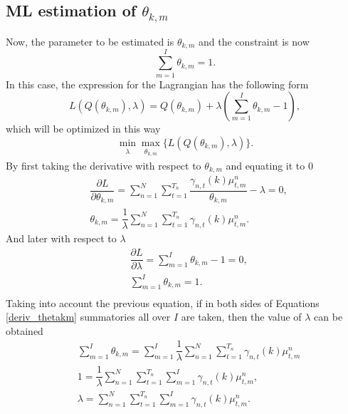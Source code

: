 \documentclass[12pt]{article}
\begin{document}
\subsection{ML estimation of $\theta_{k,m}$}
Now, the parameter to be estimated is $\theta_{k,m}$ and the constraint is now
\begin{equation}
\label{constraint_thetakm}
\sum \limits_{m=1}^{I} \theta_{k,m} = 1.
\end{equation}
In this case, the expression for the Lagrangian has the following form
\begin{equation}
\label{lagrange_thetakm}
L\left( Q(\theta_{k,m}),\lambda \right) = Q(\theta_{k,m}) + \lambda \left( \sum \limits_{m=1}^{I} \theta_{k,m} - 1 \right),
\end{equation}
which will be optimized in this way
\begin{equation}
\label{minmax_lagrange_thetakm}
\min_{\substack{\lambda}} \max_{\substack{\theta_{k,m}}} \lbrace L\left( Q(\theta_{k,m}),\lambda \right) \rbrace.
\end{equation}
By first taking the derivative with respect to $\theta_{k,m}$ and equating it to 0
\begin{equation}
\label{deriv_thetakm}
\begin{split}
& \dfrac{\partial L}{\partial \theta_{k,m}} = \sum \limits_{n=1}^{N}\sum _ { t = 1 } ^ { T _ { n } } \dfrac{\gamma_{n,t}(k)\mu_{t,m}^{n}}{\theta_{k,m}} - \lambda  = 0 , \\
& \theta_{k,m} = \dfrac{1}{\lambda} \sum \limits_{n=1}^{N} \sum _ { t = 1 } ^ { T _ { n } }\gamma_{n,t}(k)\mu_{t,m}^{n}.
\end{split}
\end{equation}
And later with respect to $\lambda$
\begin{equation}
\begin{split}
& \dfrac{\partial L}{\partial \lambda} = \sum \limits_{m=1}^{I} \theta_{k,m} - 1 = 0,\\
& \sum \limits_{m=1}^{I} \theta_{k,m} = 1.\\
\end{split}
\end{equation}
Taking into account the previous equation, if in both sides of Equations \ref{deriv_thetakm} summatories all over $I$ are taken, then the value of $\lambda$ can be obtained
\begin{equation}
\begin{split}
& \sum \limits_{m=1}^{I}\theta_{k,m} = \sum \limits_{m=1}^{I} \dfrac{1}{\lambda} \sum \limits_{n=1}^{N}\sum _ { t = 1 } ^ { T _ { n } } \gamma_{n,t}(k)\mu_{t,m}^{n}\\
& 1 = \dfrac{1}{\lambda} \sum \limits_{n=1}^{N}\sum _ { t = 1 } ^ { T _ { n } }\sum \limits_{m=1}^{I}\gamma_{n,t}(k)\mu_{t,m}^{n},\\
& \lambda = \sum \limits_{n=1}^{N}\sum \limits_{ t = 1 } ^ { T _ { n }}\sum \limits_{m=1}^{I}\gamma_{n,t}(k)\mu_{t,m}^{n}.\\
\end{split}
\end{equation}
\end{document}
